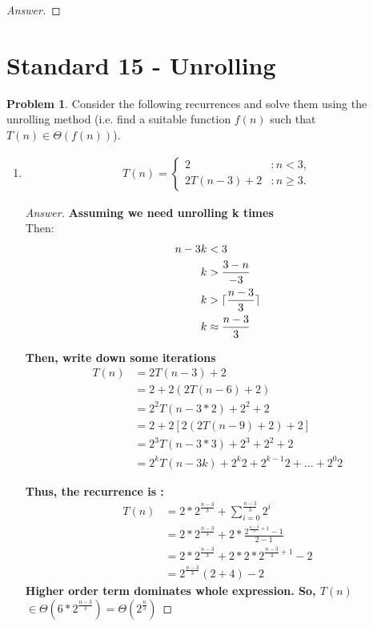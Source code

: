 \documentclass[11pt]{article}
\DeclarePairedDelimiter\ceil{\lceil}{\rceil}
\theoremstyle{definition}
\theoremstyle{definition}
\newtheorem{required}{Problem}
\theoremstyle{definition}
\begin{document}
\begin{proof}[Answer]
\end{proof}

\newpage

\section{Standard 15 - Unrolling}

\begin{required} \label{Unrolling1}
Consider the following recurrences and solve them using the unrolling method (i.e. find a suitable function $f(n)$ such that $T(n) \in \Theta(f(n))$). 
\begin{enumerate} [label=(\alph*)]
    \item 
\begin{align*}
T(n) = \begin{cases}
2 & : n < 3, \\
2T(n - 3) + 2 & : n \geq 3.
\end{cases}
\end{align*}

\begin{proof}[Answer]

\textbf{Assuming we need unrolling k times\\}
Then:\\
\begin{align*}
n-3k &< 3 \\
k &>  \frac {3-n}{-3}\\
k &> \ceil{\frac{n-3}{3}}\\
k &\approx \frac{n-3}{3}
\end{align*}

\textbf{Then, write down some iterations\\}
\begin{align*}
T(n) &= 2T(n-3)+2\\
&= 2 + 2 (2T(n-6) + 2)\\
&= 2^{2} T(n-3*2)+2^2 + 2\\
&= 2 + 2[2(2T(n-9)+2)+ 2]\\
&= 2^3 T(n-3*3) + 2^3 + 2^2 + 2\\
&= 2^{k}T(n-3k) + 2^{k}2 + 2^{k-1}2 +... + 2^{0}2
\end{align*}

\textbf{Thus, the recurrence is :\\ }
\begin{align*}
T(n) &= 2 * 2^{\frac{n-3}{3}} + \sum_{i=0}^{\frac{n-3}{3}} 2^i\\
&=  2 * 2^{\frac{n-3}{3}} + 2* \frac {2^{\frac{n-3}{3} + 1} -1 }{2-1}\\
&= 2 * 2^{\frac{n-3}{3}} + 2*2*2^{\frac{n-3}{3} + 1}- 2\\
&= 2^{\frac{n-3}{3}} (2+4) -2
\end{align*}
\textbf{Higher order term dominates whole expression. So, $T(n)$ $\in \Theta(6*2^{\frac{n-3}{3}}) = \Theta(2^{\frac{n}{3}})$} 
\end{proof}


\end{enumerate}
\end{required}
\end{document}
